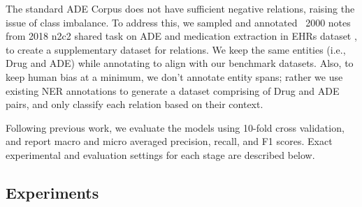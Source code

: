 \documentclass[letterpaper]{article}
\begin{document}
The standard ADE Corpus does not have sufficient negative relations, raising the issue of class imbalance. To address this, we sampled and annotated ~2000 notes from 2018 n2c2 shared task on ADE and medication extraction in EHRs dataset \cite{henry20202018}, to create a supplementary dataset for relations. We keep the same entities (i.e., Drug and ADE) while annotating to align with our benchmark datasets. Also, to keep human bias at a minimum, we don't annotate entity spans; rather we use existing NER annotations to generate a dataset comprising of Drug and ADE pairs, and only classify each relation based on their context.

Following previous work, we evaluate the models using 10-fold cross validation, and report macro and micro averaged precision, recall, and F1 scores. Exact experimental and evaluation settings for each stage are described below.

\subsection{Experiments}
\end{document}
